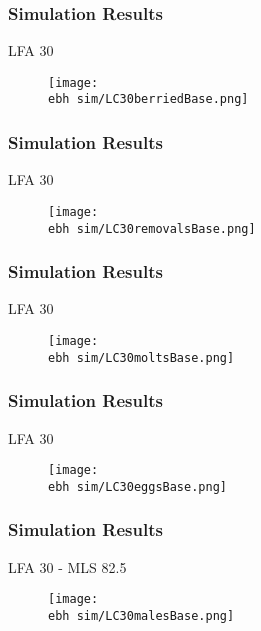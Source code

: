 \documentclass{beamer}
\newcommand{\ebh}{\string~/bio.data/bio.lobster/figures/LFA2733Framework2018/} %
\begin{document}
\begin{frame}
\frametitle{Simulation Results}
LFA 30 
\begin{figure}
        \begin{center}
            \texttt{[image: \\ebh sim/LC30berriedBase.png]}
        \end{center}
    \end{figure}
\end{frame}


\begin{frame}
\frametitle{Simulation Results}
LFA 30 
\begin{figure}
        \begin{center}
            \texttt{[image: \\ebh sim/LC30removalsBase.png]}
        \end{center}
    \end{figure}
\end{frame}


\begin{frame}
\frametitle{Simulation Results}
LFA 30 
\begin{figure}
        \begin{center}
            \texttt{[image: \\ebh sim/LC30moltsBase.png]}
        \end{center}
    \end{figure}
\end{frame}


\begin{frame}
\frametitle{Simulation Results}
LFA 30 
\begin{figure}
        \begin{center}
            \texttt{[image: \\ebh sim/LC30eggsBase.png]}
        \end{center}
    \end{figure}
\end{frame}





\begin{frame}
\frametitle{Simulation Results}
LFA 30 - MLS 82.5
\begin{figure}
        \begin{center}
            \texttt{[image: \\ebh sim/LC30malesBase.png]}
        \end{center}
    \end{figure}
\end{frame}
\end{document}
